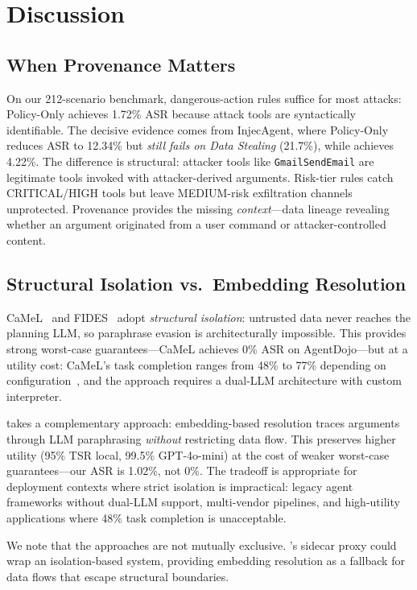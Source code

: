 \section{Discussion}
\label{sec:discussion}

\subsection{When Provenance Matters}

On our 212-scenario benchmark, dangerous-action rules suffice for most attacks: Policy-Only achieves 1.72\% ASR because attack tools are syntactically identifiable. The decisive evidence comes from InjecAgent, where Policy-Only reduces ASR to 12.34\% but \emph{still fails on Data Stealing} (21.7\%), while \sys{} achieves 4.22\%. The difference is structural: attacker tools like \texttt{GmailSendEmail} are legitimate tools invoked with attacker-derived arguments. Risk-tier rules catch CRITICAL/HIGH tools but leave MEDIUM-risk exfiltration channels unprotected. Provenance provides the missing \emph{context}---data lineage revealing whether an argument originated from a user command or attacker-controlled content.

\subsection{Structural Isolation vs.\ Embedding Resolution}

CaMeL~\cite{camel2025} and FIDES~\cite{fides2025} adopt \emph{structural isolation}: untrusted data never reaches the planning LLM, so paraphrase evasion is architecturally impossible. This provides strong worst-case guarantees---CaMeL achieves 0\% ASR on AgentDojo---but at a utility cost: CaMeL's task completion ranges from 48\% to 77\% depending on configuration~\cite{opcamel2025,agentarmor2025}, and the approach requires a dual-LLM architecture with custom interpreter.

\sys{} takes a complementary approach: embedding-based resolution traces arguments through LLM paraphrasing \emph{without} restricting data flow. This preserves higher utility (95\% TSR local, 99.5\% GPT-4o-mini) at the cost of weaker worst-case guarantees---our ASR is 1.02\%, not 0\%. The tradeoff is appropriate for deployment contexts where strict isolation is impractical: legacy agent frameworks without dual-LLM support, multi-vendor pipelines, and high-utility applications where 48\% task completion is unacceptable.

We note that the approaches are not mutually exclusive. \sys{}'s sidecar proxy could wrap an isolation-based system, providing embedding resolution as a fallback for data flows that escape structural boundaries.

